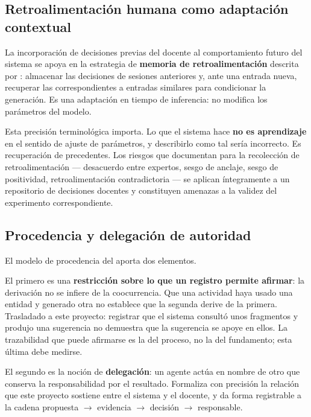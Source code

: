 \subsection{Retroalimentación humana como adaptación contextual}
\label{sec:teo-feedback}

La incorporación de decisiones previas del docente al comportamiento futuro del
sistema se apoya en la estrategia de \textbf{memoria de retroalimentación} descrita
por \textcite{fernandes2023bridging}: almacenar las decisiones de sesiones anteriores
y, ante una entrada nueva, recuperar las correspondientes a entradas similares para
condicionar la generación. Es una adaptación en tiempo de inferencia: no modifica los
parámetros del modelo.

Esta precisión terminológica importa. Lo que el sistema hace \textbf{no es
aprendizaje} en el sentido de ajuste de parámetros, y describirlo como tal sería
incorrecto. Es recuperación de precedentes. Los riesgos que \textcite{fernandes2023bridging}
documentan para la recolección de retroalimentación --- desacuerdo entre expertos,
sesgo de anclaje, sesgo de positividad, retroalimentación contradictoria --- se
aplican íntegramente a un repositorio de decisiones docentes y constituyen amenazas a
la validez del experimento correspondiente.

\subsection{Procedencia y delegación de autoridad}
\label{sec:teo-procedencia}

El modelo de procedencia del \textcite{moreau2013provdm} aporta dos elementos.

El primero es una \textbf{restricción sobre lo que un registro permite afirmar}: la
derivación no se infiere de la coocurrencia. Que una actividad haya usado una entidad
y generado otra no establece que la segunda derive de la primera. Trasladado a este
proyecto: registrar que el sistema consultó unos fragmentos y produjo una sugerencia
no demuestra que la sugerencia se apoye en ellos. La trazabilidad que puede afirmarse
es la del proceso, no la del fundamento; esta última debe medirse.

El segundo es la noción de \textbf{delegación}: un agente actúa en nombre de otro que
conserva la responsabilidad por el resultado. Formaliza con precisión la relación que
este proyecto sostiene entre el sistema y el docente, y da forma registrable a la
cadena propuesta $\rightarrow$ evidencia $\rightarrow$ decisión $\rightarrow$
responsable.

